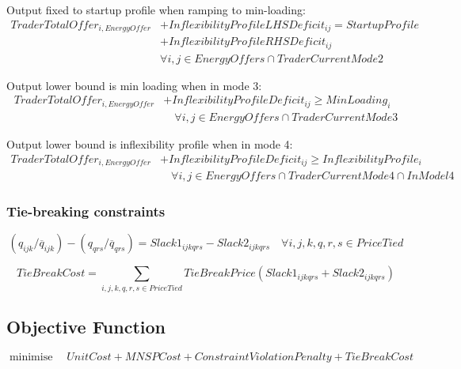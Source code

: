 \documentclass{article}
\DeclareMathOperator*{\minimise}{minimise}
\begin{document}
Output fixed to startup profile when ramping to min-loading:
\begin{equation}
\begin{split}
TraderTotalOffer_{i,EnergyOffer} & + InflexibilityProfileLHSDeficit_{ij} = StartupProfile \\
& + InflexibilityProfileRHSDeficit_{ij} \\
& \forall i,j \in EnergyOffers \cap TraderCurrentMode2
\end{split}
\end{equation}

Output lower bound is min loading when in mode 3:
\begin{equation}
\begin{split}
TraderTotalOffer_{i,EnergyOffer} & + InflexibilityProfileDeficit_{ij} \geq MinLoading_{i} \\
& \quad \forall i,j \in EnergyOffers \cap TraderCurrentMode3
\end{split}
\end{equation}

Output lower bound is inflexibility profile when in mode 4:
\begin{equation}
\begin{split}
TraderTotalOffer_{i,EnergyOffer} & + InflexibilityProfileDeficit_{ij} \geq InflexibilityProfile_{i} \\
& \quad \forall i,j \in EnergyOffers \cap TraderCurrentMode4 \cap InModel4
\end{split}
\end{equation}

\subsubsection{Tie-breaking constraints}
%

\begin{equation}
	(q_{ijk} / \overline{q}_{ijk}) - (q_{qrs} / \overline{q}_{qrs}) = Slack1_{ijkqrs} - Slack2_{ijkqrs} \quad \forall i,j,k,q,r,s \in PriceTied
\end{equation}

\begin{equation}
TieBreakCost = \sum\limits_{i,j,k,q,r,s \in PriceTied}	TieBreakPrice(Slack1_{ijkqrs} + Slack2_{ijkqrs})
\end{equation}

\subsection{Objective Function}
\begin{equation}
	\minimise \quad UnitCost + MNSPCost + ConstraintViolationPenalty + TieBreakCost
\end{equation}
\end{document}
